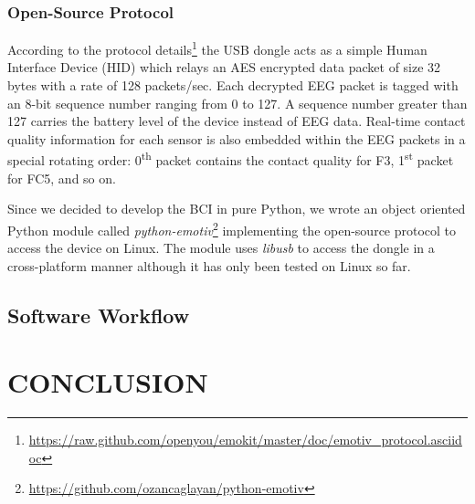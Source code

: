 \documentclass[12pt]{article}
\newcommand\mysection[1]{\vspace*{-0.35cm}\section{#1}\vspace*{6pt}\thispagestyle{empty}}
\newcommand\mysubsection[1]{\subsection{#1}}
\newcommand\mysubsubsection[1]{\subsubsection{#1}}
\numberwithin{equation}{section}
\numberwithin{figure}{section}
\numberwithin{table}{section}
\begin{document}
\mysubsubsection{Open-Source Protocol}\label{seq:emotiveeg_opensource}

\par{
According to the protocol details\footnote{\url{https://raw.github.com/openyou/emokit/master/doc/emotiv_protocol.asciidoc}}
the USB dongle acts as a simple Human Interface Device (HID) which relays an AES encrypted data packet of size 32 bytes with a rate of 128 packets/sec.
Each decrypted EEG packet is tagged with an 8-bit sequence number ranging from 0 to 127.
A sequence number greater than 127 carries the battery level of the device instead of EEG data.
Real-time contact quality information for each sensor is also embedded within the EEG
packets in a special rotating order: 0\textsuperscript{th} packet contains the contact quality for F3,
1\textsuperscript{st} packet for FC5, and so on.
}

\par{
Since we decided to develop the BCI in pure Python, we wrote an object oriented
Python module called \emph{python-emotiv}\footnote{\url{https://github.com/ozancaglayan/python-emotiv}}
implementing the open-source protocol to access the device on Linux. The module uses \emph{libusb}
to access the dongle in a cross-platform manner although it has only been tested on Linux
so far.
}

\mysubsection{Software Workflow}\label{seq:sof_workflow}
\par{
}


\clearpage
\vspace*{-0.35cm}
\mysection{CONCLUSION}\label{seq:conclusion}


\clearpage
\vspace*{-0.35cm}

\thispagestyle{empty}


\clearpage
\cfoot{}
\vspace*{-0.35cm}
\thispagestyle{empty}
\end{document}
